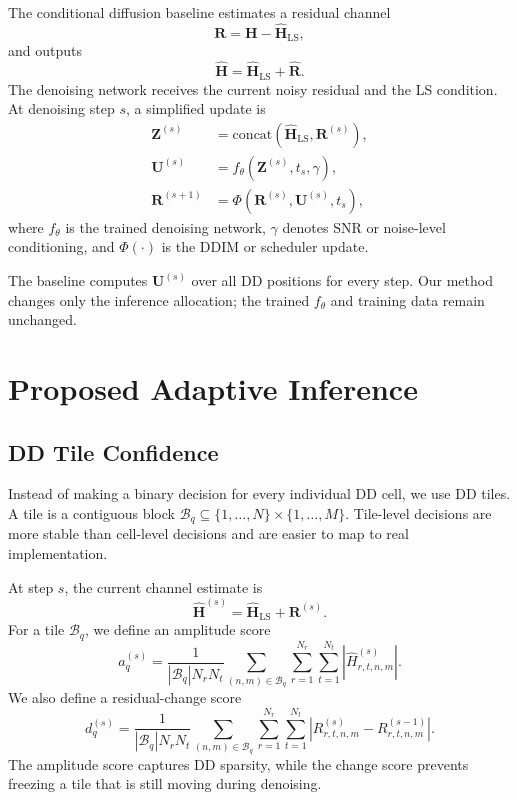 \documentclass[10pt,journal]{IEEEtran}
\newcommand{\mat}[1]{\mathbf{#1}}
\begin{document}
The conditional diffusion baseline estimates a residual channel
\begin{equation}
  \mat{R} = \mat{H} - \hat{\mat{H}}_{\mathrm{LS}},
  \label{eq:residual_def}
\end{equation}
and outputs
\begin{equation}
  \hat{\mat{H}} = \hat{\mat{H}}_{\mathrm{LS}} + \hat{\mat{R}}.
  \label{eq:final_ce}
\end{equation}
The denoising network receives the current noisy residual and the LS condition.
At denoising step $s$, a simplified update is
\begin{align}
  \mat{Z}^{(s)} &= \mathrm{concat}\left(
  \hat{\mat{H}}_{\mathrm{LS}}, \mat{R}^{(s)}\right), \\
  \mat{U}^{(s)} &= f_{\theta}\left(\mat{Z}^{(s)}, t_s, \gamma\right), \\
  \mat{R}^{(s+1)} &= \Phi\left(\mat{R}^{(s)}, \mat{U}^{(s)}, t_s\right),
  \label{eq:diffusion_update}
\end{align}
where $f_{\theta}$ is the trained denoising network, $\gamma$ denotes SNR or
noise-level conditioning, and $\Phi(\cdot)$ is the DDIM or scheduler update.

The baseline computes $\mat{U}^{(s)}$ over all DD positions for every step. Our
method changes only the inference allocation; the trained $f_{\theta}$ and
training data remain unchanged.

\section{Proposed Adaptive Inference}

\subsection{DD Tile Confidence}

Instead of making a binary decision for every individual DD cell, we use DD
tiles. A tile is a contiguous block
$\mathcal{B}_q\subseteq\{1,\ldots,N\}\times\{1,\ldots,M\}$. Tile-level decisions
are more stable than cell-level decisions and are easier to map to real
implementation.

At step $s$, the current channel estimate is
\begin{equation}
  \hat{\mat{H}}^{(s)} =
  \hat{\mat{H}}_{\mathrm{LS}} + \mat{R}^{(s)}.
  \label{eq:current_channel}
\end{equation}
For a tile $\mathcal{B}_q$, we define an amplitude score
\begin{equation}
  a_q^{(s)}
  =
  \frac{1}{|\mathcal{B}_q|N_rN_t}
  \sum_{(n,m)\in\mathcal{B}_q}
  \sum_{r=1}^{N_r}\sum_{t=1}^{N_t}
  \left|\hat{H}^{(s)}_{r,t,n,m}\right|.
  \label{eq:amplitude_score}
\end{equation}
We also define a residual-change score
\begin{equation}
  d_q^{(s)}
  =
  \frac{1}{|\mathcal{B}_q|N_rN_t}
  \sum_{(n,m)\in\mathcal{B}_q}
  \sum_{r=1}^{N_r}\sum_{t=1}^{N_t}
  \left|R^{(s)}_{r,t,n,m} - R^{(s-1)}_{r,t,n,m}\right|.
  \label{eq:change_score}
\end{equation}
The amplitude score captures DD sparsity, while the change score prevents
freezing a tile that is still moving during denoising.
\end{document}

